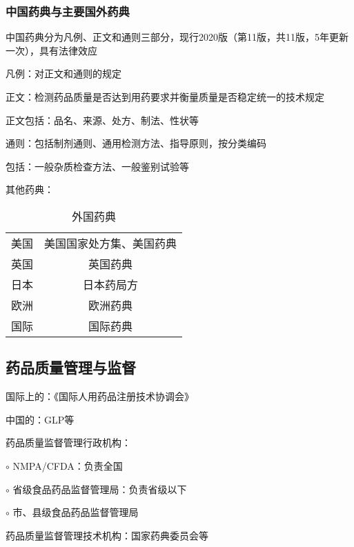 \subsubsection{中国药典与主要国外药典}%
\label{subsub:中国药典与主要国外药典}
中国药典分为凡例、正文和通则三部分，现行2020版（第11版，共11版，5年更新一次），具有法律效应
\begin{notation}
    凡例：对正文和通则的规定
\end{notation}
\begin{notation}
    正文：检测药品质量是否达到用药要求并衡量质量是否稳定统一的技术规定

    正文包括：品名、来源、处方、制法、性状等
\end{notation}
\begin{notation}
    通则：包括制剂通则、通用检测方法、指导原则，按分类编码

    包括：一般杂质检查方法、一般鉴别试验等
\end{notation}
其他药典：
\begin{table}[htpb]
    \centering
    \caption{外国药典}
    \label{tab:外国药典}
    \begin{tabular}{cc}
        \toprule
    美国 & 美国国家处方集、美国药典\\
    英国 & 英国药典\\
    日本 & 日本药局方\\
    欧洲 & 欧洲药典\\
    国际 & 国际药典\\
    \bottomrule
    \end{tabular}
\end{table}
\subsection{药品质量管理与监督}%
\label{sub:药品质量管理与监督}
国际上的：《国际人用药品注册技术协调会》

中国的：GLP等

\begin{notation}
    药品质量监督管理行政机构：

    $\circ$ NMPA/CFDA：负责全国

    $\circ$ 省级食品药品监督管理局：负责省级以下

    $\circ$ 市、县级食品药品监督管理局
\end{notation}
\begin{notation}
    药品质量监督管理技术机构：国家药典委员会等
\end{notation}
